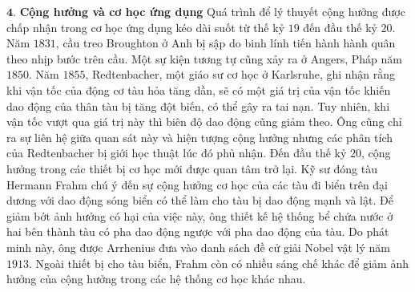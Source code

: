 \begin{multicols}{2}
\begin{figure}[H]
		\vspace*{-5pt}
	\end{figure}
	\vskip 0.2cm
	$\pmb{4.}$ \textbf{\color{timhieukhoahoc}Cộng hưởng và cơ học ứng dụng}
	\vskip 0.1cm
	Quá trình để lý thuyết cộng hưởng được chấp nhận trong cơ học ứng dụng kéo dài suốt từ thế kỷ $19$ đến đầu thế kỷ $20$. Năm $1831$, cầu treo Broughton ở Anh bị sập do binh lính tiến hành hành quân theo nhịp bước trên cầu. Một sự kiện tương tự cũng xảy ra ở Angers, Pháp năm $1850$. Năm $1855$, Redtenbacher, một giáo sư cơ học ở Karlsruhe, ghi nhận rằng khi vận tốc của động cơ tàu hỏa tăng dần, sẽ có một giá trị của vận tốc khiến dao động của thân tàu bị tăng đột biến, có thể gây ra tai nạn. Tuy nhiên, khi vận tốc vượt qua giá trị này thì biên độ dao động cũng giảm theo. Ông cũng chỉ ra sự liên hệ giữa quan sát này và hiện tượng cộng hưởng nhưng các phân tích của Redtenbacher bị giới học thuật lúc đó phủ nhận.
	\vskip 0.1cm
	Đến đầu thế kỷ $20$, cộng hưởng trong các thiết bị cơ học mới được quan tâm trở lại. Kỹ sư đóng tàu Hermann Frahm chú ý đến sự cộng hưởng cơ học của các tàu đi biển trên đại dương với dao động sóng biển có thể làm cho tàu bị dao động mạnh và lật. Để giảm bớt ảnh hưởng có hại của việc này, ông thiết kế hệ thống bể chứa nước ở hai bên thành tàu có pha dao động ngược với pha dao động của tàu. Do phát minh này, ông được Arrhenius đưa vào danh sách đề cử giải Nobel vật lý năm $1913$. Ngoài thiết bị cho tàu biển, Frahm còn có nhiều sáng chế khác để giảm ảnh hưởng của cộng hưởng trong các hệ thống cơ học khác nhau.

\end{multicols}
